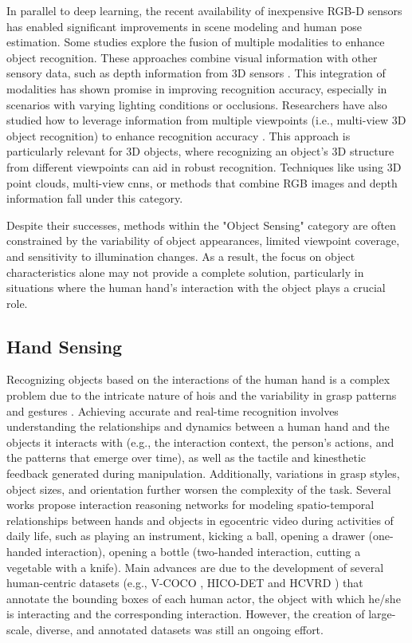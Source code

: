 In parallel to deep learning, the recent availability of inexpensive RGB-D sensors has enabled significant improvements in scene modeling and human pose estimation. Some studies explore the fusion of multiple modalities to enhance object recognition. These approaches combine visual information with other sensory data, such as depth information from 3D sensors \cite{Zimmermann2018,Rato2022}. This integration of modalities has shown promise in improving recognition accuracy, especially in scenarios with varying lighting conditions or occlusions. Researchers have also studied how to leverage information from multiple viewpoints (i.e., multi-view 3D object recognition) to enhance recognition accuracy \cite{Qi2021}. This approach is particularly relevant for 3D objects, where recognizing an object's 3D structure from different viewpoints can aid in robust recognition. Techniques like using 3D point clouds, multi-view \acs{cnn}s, or methods that combine RGB images and depth information fall under this category.

Despite their successes, methods within the "Object Sensing" category are often constrained by the variability of object appearances, limited viewpoint coverage, and sensitivity to illumination changes. As a result, the focus on object characteristics alone may not provide a complete solution, particularly in situations where the human hand's interaction with the object plays a crucial role.

\subsection{Hand Sensing}
Recognizing objects based on the interactions of the human hand is a complex problem due to the intricate nature of \acfp{hoi} and the variability in grasp patterns and gestures \cite{Chao2018,Gkioxari2018,Cao2021,Liu2021}. Achieving accurate and real-time recognition involves understanding the relationships and dynamics between a human hand and the objects it interacts with (e.g., the interaction context, the person's actions, and the patterns that emerge over time), as well as the tactile and kinesthetic feedback generated during manipulation. Additionally, variations in grasp styles, object sizes, and orientation further worsen the complexity of the task. Several works propose interaction reasoning networks for modeling spatio-temporal relationships between hands and objects in egocentric video during activities of daily life, such as playing an instrument, kicking a ball, opening a drawer (one-handed interaction), opening a bottle (two-handed interaction, cutting a vegetable with a knife). Main advances are due to the development of several human-centric datasets (e.g., V-COCO \cite{Gupta2015}, HICO-DET \cite{Chao2018} and HCVRD \cite{Zhuang2018}) that annotate the bounding boxes of each human actor, the object with which he/she is interacting and the corresponding interaction. However, the creation of large-scale, diverse, and annotated datasets was still an ongoing effort.

